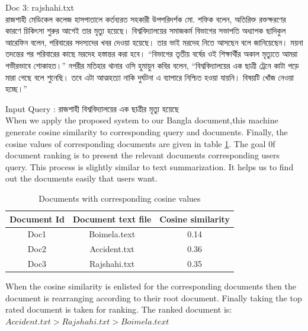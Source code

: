 Doc 3: rajshahi.txt\\
{\unicodefont রাজশাহী মেডিকেল কলেজ হাসপাতালে কর্তব্যরত সহকারী উপপরিদর্শক মো. শফিক বলেন, অতিরিক্ত রক্তক্ষরণের কারণে চিকিৎসা শুরুর আগেই তার মৃত্যু হয়েছে।  বিশ্ববিদ্যালয়ের সমাজকর্ম বিভাগের সভাপতি অধ্যাপক ছাদিকুল আরেফিন বলেন, পরিবারের সদস্যদের খবর দেওয়া হয়েছে। তার ভাই মরদেহ নিতে আসছেন বলে জানিয়েছেন। ময়না তদন্তের পর পরিবারের কাছে মরদেহ হস্তান্তর করা হবে। “বিভাগের তৃতীয় বর্ষের ওই শিক্ষার্থীর অকাল মৃত্যুতে আমরা গভীরভাবে শোকাহত।” নগরীর মতিহার থানার ওসি হুমায়ুন কবির বলেন, “বিশ্ববিদ্যালয়ের এক ছাত্রী ট্রেনে কাটা পড়ে মারা গেছে বলে শুনেছি। তবে এটা আত্মহত্যা নাকি দুর্ঘটনা এ ব্যাপারে নিশ্চিত হওয়া যায়নি। বিষয়টি খোঁজ নেওয়া হচ্ছে।”}



Input Query : {\unicodefont রাজশাহী বিশ্ববিদ্যালয়ের এক ছাত্রীর মৃত্যু হয়েছে}\\

When we apply the proposed system to our Bangla document,this machine generate cosine similarity to corresponding query and documents. Finally, the cosine values of corresponding documents are given in table \ref{tab:cosine values}. The goal 0f document ranking is to present the relevant documents corresponding users query. This process is slightly similar to text summarization. It helps us to find out the documents easily that users want.

\begin{table}[htp]	
\centering

  \caption{Documents with corresponding cosine values }
\vspace{0.5cm}
\begin{tabular}{|c|c|c|} 
\hline

\textbf{Document Id}	 & \textbf{Document text file} & \textbf{Cosine similarity} \\ \hline
 Doc1 & Boimela.text &	0.14   \\ \hline
 Doc2 & Accident.txt & 0.36  \\ \hline
 Doc3  & Rajshahi.txt & 0.35       \\ \hline


\end{tabular}
\label{tab:cosine values}
\end{table}



When the cosine similarity is enlisted for the corresponding documents then the document is rearranging according to their root document. Finally taking the top rated document is taken for ranking. The ranked document is:\\
		$Accident.txt > Rajshahi.txt > Boimela.text$
		
